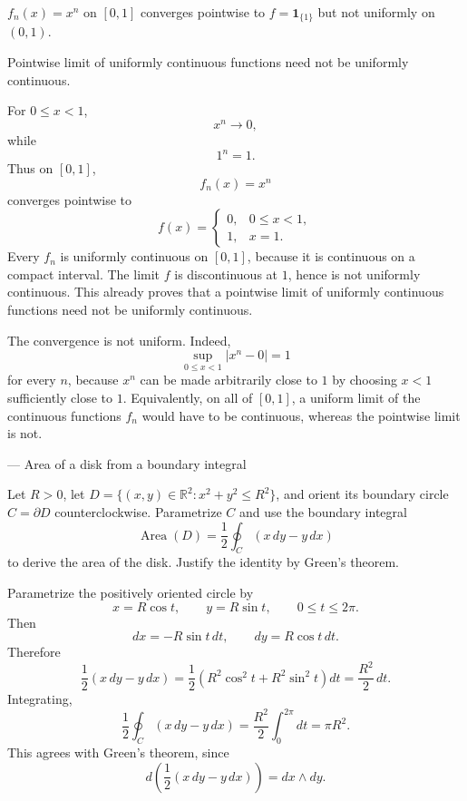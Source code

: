 \begin{problem}[CP-IV-0001]
\label{prob:cp-iv-0001}
$f_n(x)=x^n$ on $[0,1]$ converges pointwise to $f=\mathbf{1}_{\{1\}}$ but not uniformly on $(0,1)$.
	\par\noindent\textbullet\quad Pointwise limit of uniformly continuous functions need not be uniformly continuous.
\end{problem}

\begin{solution}
For \(0\le x<1\),
\[
x^n\longrightarrow0,
\]
while
\[
1^n=1.
\]
Thus on \([0,1]\),
\[
f_n(x)=x^n
\]
converges pointwise to
\[
f(x)=
\begin{cases}
0,&0\le x<1,\\
1,&x=1.
\end{cases}
\]
Every \(f_n\) is uniformly continuous on \([0,1]\), because it is continuous on a compact interval. The limit \(f\) is discontinuous at \(1\), hence is not uniformly continuous. This already proves that a pointwise limit of uniformly continuous functions need not be uniformly continuous.

The convergence is not uniform. Indeed,
\[
\sup_{0\le x<1}|x^n-0|=1
\]
for every \(n\), because \(x^n\) can be made arbitrarily close to \(1\) by choosing \(x<1\) sufficiently close to \(1\). Equivalently, on all of \([0,1]\), a uniform limit of the continuous functions \(f_n\) would have to be continuous, whereas the pointwise limit is not.
\end{solution}


\begin{problem}[CP-IV-0002]
\label{prob:cp-iv-0002}
— Area of a disk from a boundary integral

Let $R>0$, let $D=\{(x,y)\in\mathbb R^2:x^2+y^2\le R^2\}$,
and orient its boundary circle $C=\partial D$ counterclockwise.
Parametrize $C$ and use the boundary integral
\[
\operatorname{Area}(D)=\frac12\oint_C(x\,dy-y\,dx)
\]
to derive the area of the disk. Justify the identity by Green's theorem.
\end{problem}

\begin{solution}
Parametrize the positively oriented circle by
\[
x=R\cos t,\qquad
y=R\sin t,
\qquad
0\le t\le2\pi.
\]
Then
\[
dx=-R\sin t\,dt,
\qquad
dy=R\cos t\,dt.
\]
Therefore
\[
\frac12(x\,dy-y\,dx)
=
\frac12
\left(
R^2\cos^2t+R^2\sin^2t
\right)dt
=
\frac{R^2}{2}\,dt.
\]
Integrating,
\[
\frac12\oint_C(x\,dy-y\,dx)
=
\frac{R^2}{2}\int_0^{2\pi}dt
=
\boxed{\pi R^2}.
\]
This agrees with Green's theorem, since
\[
d\!\left(\frac12(x\,dy-y\,dx)\right)=dx\wedge dy.
\]
\end{solution}


